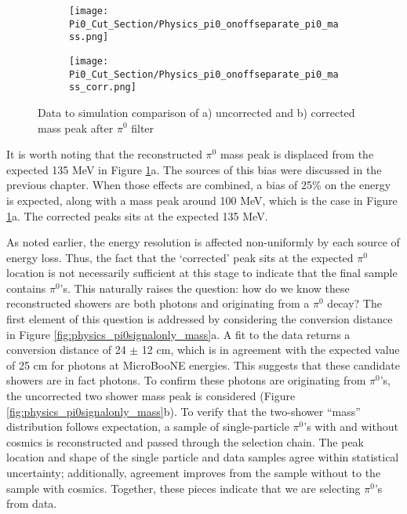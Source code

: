 \begin{figure}[H]
  \begin{subfigure}[t]{0.3\textwidth}
\texttt{[image: Pi0\_Cut\_Section/Physics\_pi0\_onoffseparate\_pi0\_mass.png]}
 \caption{ }
 \end{subfigure} 
 \hspace{34mm}
  \begin{subfigure}[t]{0.3\textwidth}
\texttt{[image: Pi0\_Cut\_Section/Physics\_pi0\_onoffseparate\_pi0\_mass\_corr.png]}
  \caption{ }
  \end{subfigure} 
\caption{ Data to simulation comparison of a) uncorrected and b) corrected mass peak after $\pi^0$ filter }
\label{fig:physics_pi0_mass} 
\end{figure}


\par It is worth noting that the reconstructed $\pi^0$ mass peak is displaced from the expected 135 MeV in Figure \ref{fig:physics_pi0_mass}a. The sources of this bias were discussed in the previous chapter. When those effects are combined, a bias of 25\% on the energy is expected, along with a mass peak around 100 MeV, which is the case in Figure \ref{fig:physics_pi0_mass}a. The corrected peaks sits at the expected 135 MeV. 
\par As noted earlier, the energy resolution is affected non-uniformly by each source of energy loss.  Thus, the fact that the `corrected' peak sits at the expected $\pi^0$ location is not necessarily sufficient at this stage to indicate that the final sample contains $\pi^0$'s. This naturally raises the question: how do we know these reconstructed showers are both photons and originating from a $\pi^0$ decay? The first element of this question is addressed by considering the conversion distance in Figure \ref{fig:physics_pi0signalonly_mass}a. A fit to the data returns a conversion distance of 24 $\pm$ 12 cm, which is in agreement with the expected value of 25 cm for photons at MicroBooNE energies. This suggests that these candidate showers are in fact photons. To confirm these photons are originating from $\pi^0$'s, the uncorrected two shower mass peak is considered (Figure \ref{fig:physics_pi0signalonly_mass}b). To verify that the two-shower “mass” distribution follows expectation, a sample of single-particle $\pi^0$’s with and without cosmics is reconstructed and passed through the selection chain. The peak location and shape of the single particle and data samples agree within statistical uncertainty; additionally, agreement improves from the sample without to the sample with cosmics. Together, these pieces indicate that we are selecting $\pi^0$'s from data. 



